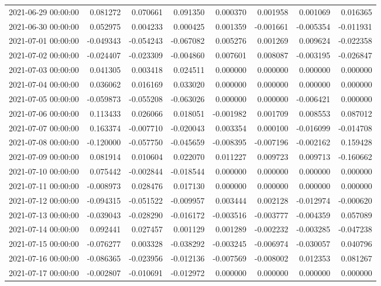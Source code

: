 \begin{tabular}{lrrrrrrr}
2021-06-29 00:00:00 & 0.081272 & 0.070661 & 0.091350 & 0.000370 & 0.001958 & 0.001069 & 0.016365 \\
2021-06-30 00:00:00 & 0.052975 & 0.004233 & 0.000425 & 0.001359 & -0.001661 & -0.005354 & -0.011931 \\
2021-07-01 00:00:00 & -0.049343 & -0.054243 & -0.067082 & 0.005276 & 0.001269 & 0.009624 & -0.022358 \\
2021-07-02 00:00:00 & -0.024407 & -0.023309 & -0.004860 & 0.007601 & 0.008087 & -0.003195 & -0.026847 \\
2021-07-03 00:00:00 & 0.041305 & 0.003418 & 0.024511 & 0.000000 & 0.000000 & 0.000000 & 0.000000 \\
2021-07-04 00:00:00 & 0.036062 & 0.016169 & 0.033020 & 0.000000 & 0.000000 & 0.000000 & 0.000000 \\
2021-07-05 00:00:00 & -0.059873 & -0.055208 & -0.063026 & 0.000000 & 0.000000 & -0.006421 & 0.000000 \\
2021-07-06 00:00:00 & 0.113433 & 0.026066 & 0.018051 & -0.001982 & 0.001709 & 0.008553 & 0.087012 \\
2021-07-07 00:00:00 & 0.163374 & -0.007710 & -0.020043 & 0.003354 & 0.000100 & -0.016099 & -0.014708 \\
2021-07-08 00:00:00 & -0.120000 & -0.057750 & -0.045659 & -0.008395 & -0.007196 & -0.002162 & 0.159428 \\
2021-07-09 00:00:00 & 0.081914 & 0.010604 & 0.022070 & 0.011227 & 0.009723 & 0.009713 & -0.160662 \\
2021-07-10 00:00:00 & 0.075442 & -0.002844 & -0.018544 & 0.000000 & 0.000000 & 0.000000 & 0.000000 \\
2021-07-11 00:00:00 & -0.008973 & 0.028476 & 0.017130 & 0.000000 & 0.000000 & 0.000000 & 0.000000 \\
2021-07-12 00:00:00 & -0.094315 & -0.051522 & -0.009957 & 0.003444 & 0.002128 & -0.012974 & -0.000620 \\
2021-07-13 00:00:00 & -0.039043 & -0.028290 & -0.016172 & -0.003516 & -0.003777 & -0.004359 & 0.057089 \\
2021-07-14 00:00:00 & 0.092441 & 0.027457 & 0.001129 & 0.001289 & -0.002232 & -0.003285 & -0.047238 \\
2021-07-15 00:00:00 & -0.076277 & 0.003328 & -0.038292 & -0.003245 & -0.006974 & -0.030057 & 0.040796 \\
2021-07-16 00:00:00 & -0.086365 & -0.023956 & -0.012136 & -0.007569 & -0.008002 & 0.012353 & 0.081267 \\
2021-07-17 00:00:00 & -0.002807 & -0.010691 & -0.012972 & 0.000000 & 0.000000 & 0.000000 & 0.000000 \\

\end{tabular}
